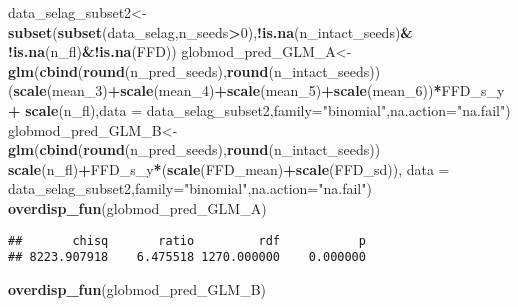 \documentclass[
]{article}
\newenvironment{Shaded}{\begin{snugshade}}{\end{snugshade}}
\newcommand{\DataTypeTok}[1]{\textcolor[rgb]{0.13,0.29,0.53}{#1}}
\newcommand{\DecValTok}[1]{\textcolor[rgb]{0.00,0.00,0.81}{#1}}
\newcommand{\KeywordTok}[1]{\textcolor[rgb]{0.13,0.29,0.53}{\textbf{#1}}}
\newcommand{\NormalTok}[1]{#1}
\newcommand{\OperatorTok}[1]{\textcolor[rgb]{0.81,0.36,0.00}{\textbf{#1}}}
\newcommand{\StringTok}[1]{\textcolor[rgb]{0.31,0.60,0.02}{#1}}
\begin{document}
\begin{Shaded}
\begin{Highlighting}[]
\NormalTok{data_selag_subset2<-}\KeywordTok{subset}\NormalTok{(}\KeywordTok{subset}\NormalTok{(data_selag,n_seeds}\OperatorTok{>}\DecValTok{0}\NormalTok{),}\OperatorTok{!}\KeywordTok{is.na}\NormalTok{(n_intact_seeds)}\OperatorTok{&}
\StringTok{                             }\OperatorTok{!}\KeywordTok{is.na}\NormalTok{(n_fl)}\OperatorTok{&!}\KeywordTok{is.na}\NormalTok{(FFD))}
\NormalTok{globmod_pred_GLM_A<-}\KeywordTok{glm}\NormalTok{(}\KeywordTok{cbind}\NormalTok{(}\KeywordTok{round}\NormalTok{(n_pred_seeds),}\KeywordTok{round}\NormalTok{(n_intact_seeds))}\OperatorTok{~}
\StringTok{                        }\NormalTok{(}\KeywordTok{scale}\NormalTok{(mean_}\DecValTok{3}\NormalTok{)}\OperatorTok{+}\KeywordTok{scale}\NormalTok{(mean_}\DecValTok{4}\NormalTok{)}\OperatorTok{+}\KeywordTok{scale}\NormalTok{(mean_}\DecValTok{5}\NormalTok{)}\OperatorTok{+}\KeywordTok{scale}\NormalTok{(mean_}\DecValTok{6}\NormalTok{))}\OperatorTok{*}\NormalTok{FFD_s_y}\OperatorTok{+}
\StringTok{                          }\KeywordTok{scale}\NormalTok{(n_fl),}\DataTypeTok{data =}\NormalTok{ data_selag_subset2,}\DataTypeTok{family=}\StringTok{"binomial"}\NormalTok{,}\DataTypeTok{na.action=}\StringTok{"na.fail"}\NormalTok{)}
\NormalTok{globmod_pred_GLM_B<-}\KeywordTok{glm}\NormalTok{(}\KeywordTok{cbind}\NormalTok{(}\KeywordTok{round}\NormalTok{(n_pred_seeds),}\KeywordTok{round}\NormalTok{(n_intact_seeds))}\OperatorTok{~}
\StringTok{                        }\KeywordTok{scale}\NormalTok{(n_fl)}\OperatorTok{+}\NormalTok{FFD_s_y}\OperatorTok{*}\NormalTok{(}\KeywordTok{scale}\NormalTok{(FFD_mean)}\OperatorTok{+}\KeywordTok{scale}\NormalTok{(FFD_sd)),}
                         \DataTypeTok{data =}\NormalTok{ data_selag_subset2,}\DataTypeTok{family=}\StringTok{"binomial"}\NormalTok{,}\DataTypeTok{na.action=}\StringTok{"na.fail"}\NormalTok{)}
\KeywordTok{overdisp_fun}\NormalTok{(globmod_pred_GLM_A)}
\end{Highlighting}
\end{Shaded}

\begin{verbatim}
##       chisq       ratio         rdf           p 
## 8223.907918    6.475518 1270.000000    0.000000
\end{verbatim}

\begin{Shaded}
\begin{Highlighting}[]
\KeywordTok{overdisp_fun}\NormalTok{(globmod_pred_GLM_B)}
\end{Highlighting}
\end{Shaded}
\end{document}

